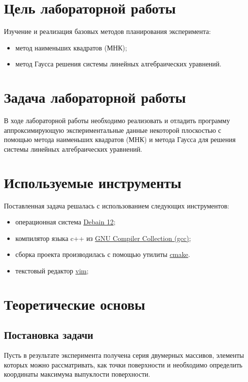\section{Цель лабораторной работы}

Изучение и реализация базовых методов планирования эксперимента:
\begin{itemize}
    \item{метод наименьших квадратов (МНК);}
    \item{метод Гаусса решения системы линейных алгебраических уравнений.}
\end{itemize}

\section{Задача лабораторной работы}

В ходе лабораторной работы необходимо реализовать и отладить программу аппроксимирующую экспериментальные данные некоторой плоскостью с помощью метода наименьших квадратов (МНК) и метода Гаусса для решения системы линейных алгебраических уравнений.

\section{Используемые инструменты}

Поставленная задача решалась с использованием следующих инструментов:
\begin{itemize}
    \item{операционная система \href{https://debian.org}{Debain 12};}
    \item{компилятор языка c++ из \href{https://gcc.gnu.org/}{GNU Compiler Collection (gcc)};}
    \item{сборка проекта производилась с помощью утилиты \href{https://cmake.org/}{cmake}.}
    \item{текстовый редактор \href{https://ru.wikipedia.org/wiki/Vim}{vim};}
\end{itemize}

\section{Теоретические основы}

\subsection{Постановка задачи}
Пусть в результате эксперимента получена серия двумерных массивов, элементы которых можно рассматривать, как точки поверхности и необходимо определить координаты максимума выпуклости поверхности.

